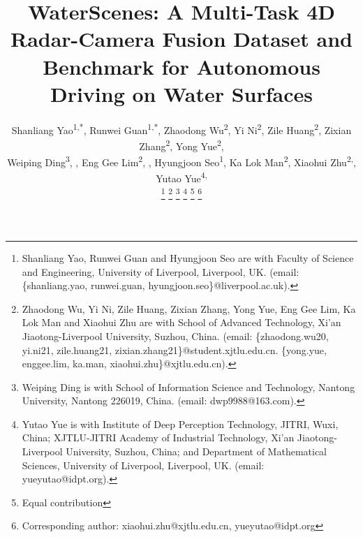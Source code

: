 \documentclass[lettersize,journal]{IEEEtran}
\begin{document}
\title{WaterScenes: A Multi-Task 4D Radar-Camera Fusion Dataset and Benchmark for Autonomous Driving on Water Surfaces}

\author{
Shanliang Yao\textsuperscript{1,*}, Runwei Guan\textsuperscript{1,*}, Zhaodong Wu\textsuperscript{2}, Yi Ni\textsuperscript{2}, Zile Huang\textsuperscript{2}, Zixian Zhang\textsuperscript{2}, Yong Yue\textsuperscript{2}, \\ Weiping Ding\textsuperscript{3}, , Eng Gee Lim\textsuperscript{2}, , Hyungjoon Seo\textsuperscript{1}, Ka Lok Man\textsuperscript{2}, Xiaohui Zhu\textsuperscript{2,}, Yutao Yue\textsuperscript{4,}


\thanks{ Shanliang Yao, Runwei Guan and Hyungjoon Seo are with Faculty of Science and Engineering, University of Liverpool, Liverpool, UK. (email: \{shanliang.yao, runwei.guan, hyungjoon.seo\}@liverpool.ac.uk).}
\thanks{ Zhaodong Wu, Yi Ni, Zile Huang, Zixian Zhang, Yong Yue, Eng Gee Lim, Ka Lok Man and Xiaohui Zhu are with School of Advanced Technology, Xi'an Jiaotong-Liverpool University, Suzhou, China. (email: \{zhaodong.wu20, yi.ni21, zile.huang21, zixian.zhang21\}@student.xjtlu.edu.cn. \{yong.yue, enggee.lim, ka.man, xiaohui.zhu\}@xjtlu.edu.cn).}
\thanks{ Weiping Ding is with School of Information Science and Technology, Nantong University, Nantong 226019, China. (email: dwp9988@163.com).}
\thanks{ Yutao Yue is with Institute of Deep Perception Technology, JITRI, Wuxi, China; XJTLU-JITRI Academy of Industrial Technology, Xi'an Jiaotong-Liverpool University, Suzhou, China; and Department of Mathematical Sciences, University of Liverpool, Liverpool, UK. (email: yueyutao@idpt.org).}
\thanks{ Equal contribution}
\thanks{ Corresponding author: xiaohui.zhu@xjtlu.edu.cn, yueyutao@idpt.org}
}


\maketitle
\end{document}
